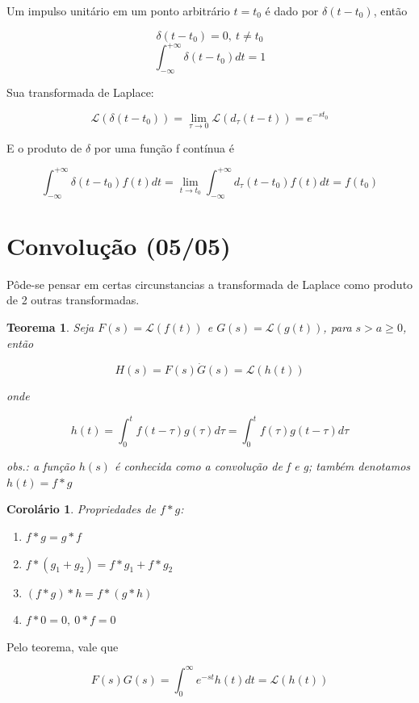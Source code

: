 \documentclass[12pt]{article}
\newtheorem{theorem}{Teorema}[section]
\newtheorem{corollary}{Corolário}[theorem]
\begin{document}
Um impulso unitário em um ponto arbitrário $t = t_0$ é dado por $\delta (t - t_0)$, então

$$\delta (t - t_0) = 0, \ t \neq t_0$$
$$\int_{- \infty}^{+ \infty} \delta (t - t_0) d t = 1$$

Sua transformada de Laplace:

$$\mathscr{L}(\delta(t - t_0)) = \lim_{\tau \xrightarrow{} 0} \mathscr{L}(d_\tau (t - t)) = e^{- st_0}$$

E o produto de $\delta$ por uma função f contínua é

$$\int_{- \infty}^{+ \infty} \delta (t - t_0) f(t) d t = \lim_{t \xrightarrow{} t_0} \int_{- \infty}^{+ \infty} d_\tau (t - t_0) f(t) d t = f(t_0)$$

\section{Convolução (05/05)}
Pôde-se pensar em certas circunstancias a transformada de Laplace como produto de 2 outras transformadas.

\begin{theorem}
    Seja $F(s) = \mathscr{L}(f(t))$ e $G(s) = \mathscr{L} (g(t))$, para $s > a \geq 0$, então
    
    $$H(s) = F(s) \dot G(s) = \mathscr{L}(h(t))$$
    
    onde 
    
    $$h(t) = \int_0^t f(t - \tau) g(\tau) d \tau = \int_0^t f(\tau) g(t - \tau) d \tau$$
    
    obs.: a função $h(s)$ é conhecida como a convolução de f e g; também denotamos $h(t) = f * g$
\end{theorem}

\begin{corollary}
    Propriedades de $f * g$:
    
    \begin{enumerate}
        \item $f * g = g * f$
        \item $f * (g_1 + g_2) = f * g_1 + f * g_2$
        \item $(f * g) * h = f * (g * h)$
        \item $f * 0 = 0, \ 0 * f = 0$
    \end{enumerate}
\end{corollary}

Pelo teorema, vale que

$$F(s) G(s) = \int_0^\infty e^{- st} h(t) d t = \mathscr{L}(h(t))$$
\end{document}
